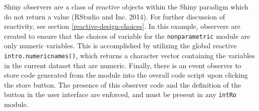 \documentclass[12pt,]{article}
\newenvironment{Shaded}{\begin{snugshade}}{\end{snugshade}}
\newcommand{\KeywordTok}[1]{\textcolor[rgb]{0.13,0.29,0.53}{\textbf{{#1}}}}
\newcommand{\DataTypeTok}[1]{\textcolor[rgb]{0.13,0.29,0.53}{{#1}}}
\newcommand{\DecValTok}[1]{\textcolor[rgb]{0.00,0.00,0.81}{{#1}}}
\newcommand{\CharTok}[1]{\textcolor[rgb]{0.31,0.60,0.02}{{#1}}}
\newcommand{\StringTok}[1]{\textcolor[rgb]{0.31,0.60,0.02}{{#1}}}
\newcommand{\OtherTok}[1]{\textcolor[rgb]{0.56,0.35,0.01}{{#1}}}
\newcommand{\NormalTok}[1]{{#1}}
\begin{document}
\begin{Shaded}
\end{Shaded}

Shiny observers are a class of reactive objects within the Shiny
paradigm which do not return a value (RStudio and Inc. 2014). For
further discussion of reactivity, see section
\ref{reactive-design-choices}. In this example, observers are created to
ensure that the choices of variable for the \texttt{nonparametric}
module are only numeric variables. This is accomplished by utilizing the
global reactive \texttt{intro.numericnames()}, which returns a character
vector containing the variables in the current dataset that are numeric.
Finally, there is an event observer to store code generated from the
module into the overall code script upon clicking the store button. The
presence of this observer code and the definition of the button in the
user interface are enforced, and must be present in any \texttt{intRo}
module.
\end{document}

